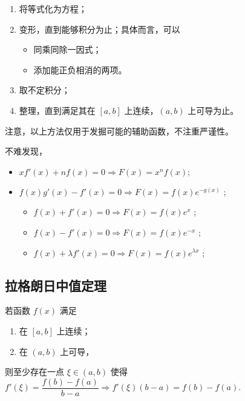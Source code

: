 \begin{Field}[构造辅助函数的方法]

    \begin{enumerate}
        \item 将等式化为方程；
        \item 变形，直到能够积分为止；具体而言，可以\begin{itemize}
            \item 同乘同除一因式；
            \item 添加能正负相消的两项。
        \end{itemize}
        \item 取不定积分；
        \item 整理，直到满足其在 $ [a,b] $ 上连续，$ (a,b) $ 上可导为止。
    \end{enumerate}
    注意，以上方法仅用于发掘可能的辅助函数，不注重严谨性。
\end{Field}

不难发现，\begin{itemize}
    \item $ xf'(x) + nf(x) = 0 \Rightarrow F(x) = x^n f(x); $ 
    \item $ f(x)g'(x)-f'(x)=0\Rightarrow F(x)=f(x)e^{-g(x)} $ ;
    \begin{itemize}
        \item $ f(x)+f'(x)=0\Rightarrow F(x)=f(x)e^x $ ;
        \item $ f(x)-f'(x)=0\Rightarrow F(x)=f(x)e^{-x} $ ;
        \item $ f(x)+\lambda f'(x)=0\Rightarrow F(x)=f(x)e^{\lambda x} $ ;
    \end{itemize}

\end{itemize}

\subsection{拉格朗日中值定理}

\begin{Theo}[拉格朗日中值定理]

    若函数 $ f(x) $ 满足
    \begin{enumerate}
        \item 在 $ [a,b] $ 上连续；
        \item 在 $ (a,b) $ 上可导， 
    \end{enumerate}
    则至少存在一点 $ \xi \in (a,b) $ 使得 $ f'(\xi)=\dfrac{f(b)-f(a)}{b-a} 
    \Rightarrow f'(\xi)(b-a)=f(b)-f(a).$
\end{Theo}

